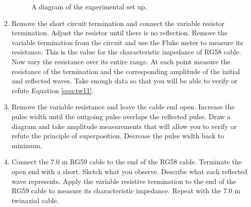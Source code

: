 \begin{enumerate}
\begin{figure}
\caption{A diagram of the experimental set up.}
\label{fig:tw1}
\end{figure}

\item Remove the short circuit termination and connect the variable resistor termination. Adjust the resistor until there is no reflection. Remove the variable termination from the circuit and use the Fluke meter to measure its resistance. This is the value for the characteristic impedance of RG58 cable. Now vary the resistance over its entire range. At each point measure the resistance of the termination and the corresponding amplitude of the initial and reflected waves. Take enough data so that you will be able to verify or refute Equation \ref{equ:tw11}.

\item Remove the variable resistance and leave the cable end open. Increase the pulse width until the outgoing pulse overlaps the reflected pulse. Draw a diagram and take amplitude measurements that will allow you to verify or refute the principle of superposition. Decrease the pulse width back to minimum.

\item Connect the 7.0 m RG59 cable to the end of the RG58 cable. Terminate the open end with a short. Sketch what you observe. Describe what each reflected wave represents. Apply the variable resistive termination to the end of the RG59 cable to measure its characteristic impedance. Repeat with the 7.0 m twinaxial cable. %


\end{enumerate}

